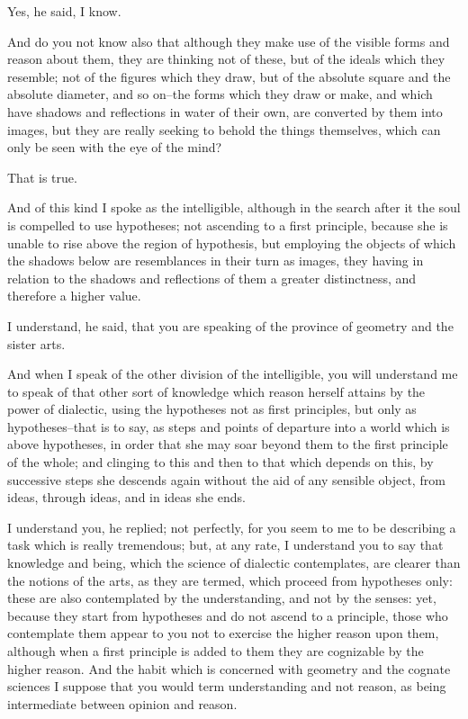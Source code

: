 Yes, he said, I know.

And do you not know also that although they make use of the visible
forms and reason about them, they are thinking not of these, but of the
ideals which they resemble; not of the figures which they draw, but
of the absolute square and the absolute diameter, and so on--the forms
which they draw or make, and which have shadows and reflections in water
of their own, are converted by them into images, but they are really
seeking to behold the things themselves, which can only be seen with the
eye of the mind?

That is true.

And of this kind I spoke as the intelligible, although in the search
after it the soul is compelled to use hypotheses; not ascending to
a first principle, because she is unable to rise above the region of
hypothesis, but employing the objects of which the shadows below are
resemblances in their turn as images, they having in relation to the
shadows and reflections of them a greater distinctness, and therefore a
higher value.

I understand, he said, that you are speaking of the province of geometry
and the sister arts.

And when I speak of the other division of the intelligible, you will
understand me to speak of that other sort of knowledge which reason
herself attains by the power of dialectic, using the hypotheses not as
first principles, but only as hypotheses--that is to say, as steps and
points of departure into a world which is above hypotheses, in order
that she may soar beyond them to the first principle of the whole; and
clinging to this and then to that which depends on this, by successive
steps she descends again without the aid of any sensible object, from
ideas, through ideas, and in ideas she ends.

I understand you, he replied; not perfectly, for you seem to me to
be describing a task which is really tremendous; but, at any rate, I
understand you to say that knowledge and being, which the science of
dialectic contemplates, are clearer than the notions of the arts, as
they are termed, which proceed from hypotheses only: these are also
contemplated by the understanding, and not by the senses: yet, because
they start from hypotheses and do not ascend to a principle, those who
contemplate them appear to you not to exercise the higher reason
upon them, although when a first principle is added to them they are
cognizable by the higher reason. And the habit which is concerned
with geometry and the cognate sciences I suppose that you would term
understanding and not reason, as being intermediate between opinion and
reason.

